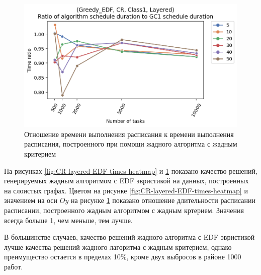 \begin{figure}[!htbp]
    \centering
    \includegraphics[width=\textwidth]{imgs/layered_class_1/CR_EDF/gr_amalgamated.png}
    \caption{Отношение времени выполнения расписания к времени выполнения расписания, построенного при помощи жадного алгоритма с жадным критерием}
    \label{fig:CR-layered-EDF-times-compiled}
\end{figure}

На рисунках \ref{fig:CR-layered-EDF-times-heatmap} и \ref{fig:CR-layered-EDF-times-compiled} показано качество решений, генерируемых жадным алгоритмом с EDF эвристикой на данных, построенных на слоистых графах. Цветом на рисунке \ref{fig:CR-layered-EDF-times-heatmap} и значением на оси $Oy$ на рисунке \ref{fig:CR-layered-EDF-times-compiled} показано отношение длительности расписании расписании, построенного жадным алгоритмом с жадным кртерием. Значения всегда больше 1, чем меньше, тем лучше.

В большинстве случаев, качество решений жадного алгоритма с EDF эвристикой лучше качества решений жадного лагоритма с жадным критерием, однако преимущество остается в пределах 10\%, кроме двух выбросов в районе 1000 работ. 

